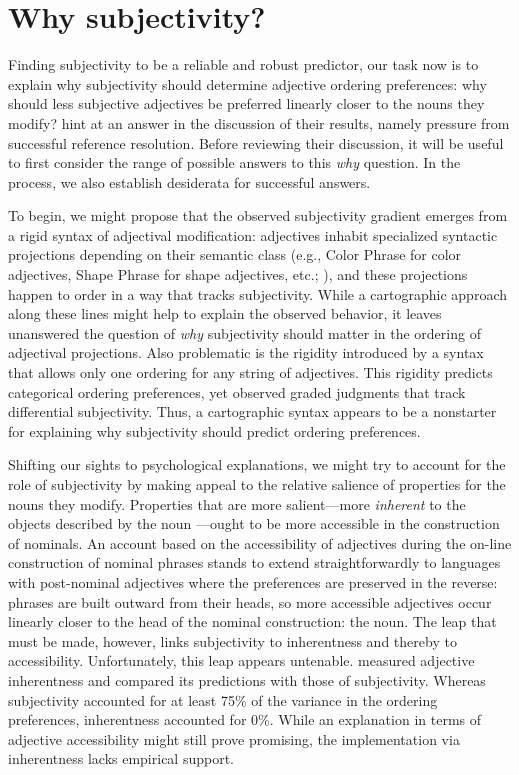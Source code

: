 \documentclass[preprint,authoryear]{elsarticle}\frenchspacing
\begin{document}
\section{Why subjectivity?} \label{why}

Finding subjectivity to be a reliable and robust predictor, our task now is to explain why subjectivity should determine adjective ordering preferences: why should less subjective adjectives be preferred linearly closer to the nouns they modify? \citeauthor{scontrasetal2017adjectives} hint at an answer in the discussion of their results, namely pressure from successful reference resolution. Before reviewing their discussion, it will be useful to first consider the range of possible answers to this \emph{why} question. In the process, we also establish desiderata for successful answers.

To begin, we might propose that the observed subjectivity gradient emerges from a rigid syntax of adjectival modification: adjectives inhabit specialized syntactic projections depending on their semantic class (e.g., Color Phrase for color adjectives, Shape Phrase for shape adjectives, etc.; \citealp{cinque1994,scott2002,laenzlinger2005}), and these projections happen to order in a way that tracks subjectivity. While a cartographic approach along these lines might help to explain the observed behavior, it leaves unanswered the question of \emph{why} subjectivity should matter in the ordering of adjectival projections. Also problematic is the rigidity introduced by a syntax that allows only one ordering for any string of adjectives. This rigidity predicts categorical ordering preferences, yet \citeauthor{scontrasetal2017adjectives} observed graded judgments that track differential subjectivity. Thus, a cartographic syntax appears to be a nonstarter for explaining why subjectivity should predict ordering preferences.

Shifting our sights to psychological explanations, we might try to account for the role of subjectivity by making appeal to the relative salience of properties for the nouns they modify. Properties that are more salient---more \emph{inherent} to the objects described by the noun \citep{sweet1898,whorf1945,biberetal1999}---ought to be more accessible in the construction of nominals. An account based on the accessibility of adjectives during the on-line construction of nominal phrases stands to extend straightforwardly to languages with post-nominal adjectives where the preferences are preserved in the reverse: phrases are built outward from their heads, so more accessible adjectives occur linearly closer to the head of the nominal construction: the noun. The leap that must be made, however, links subjectivity to inherentness and thereby to accessibility. Unfortunately, this leap appears untenable. \citeauthor{scontrasetal2017adjectives} measured adjective inherentness and compared its predictions with those of subjectivity. Whereas subjectivity accounted for at least 75\% of the variance in the ordering preferences, inherentness accounted for 0\%. While an explanation in terms of adjective accessibility might still prove promising, the implementation via inherentness lacks empirical support.
\end{document}
